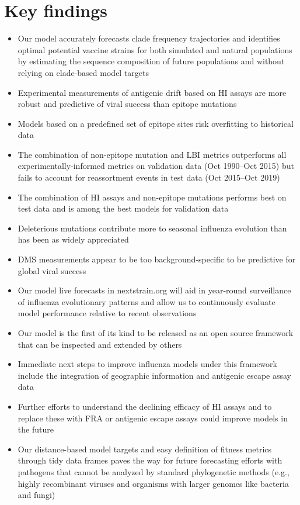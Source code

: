 \section*{Key findings}

\begin{itemize}
\item{Our model accurately forecasts clade frequency trajectories and identifies optimal potential vaccine strains for both simulated and natural populations by estimating the sequence composition of future populations and without relying on clade-based model targets}
\item{Experimental measurements of antigenic drift based on HI assays are more robust and predictive of viral success than epitope mutations}
\item{Models based on a predefined set of epitope sites risk overfitting to historical data}
\item{The combination of non-epitope mutation and LBI metrics outperforms all experimentally-informed metrics on validation data (Oct 1990--Oct 2015) but fails to account for reassortment events in test data (Oct 2015--Oct 2019)}
\item{The combination of HI assays and non-epitope mutations performs best on test data and is among the best models for validation data}
\item{Deleterious mutations contribute more to seasonal influenza evolution than has been as widely appreciated}
\item{DMS measurements appear to be too background-specific to be predictive for global viral success}
\item{Our model live forecasts in nextstrain.org will aid in year-round surveillance of influenza evolutionary patterns and allow us to continuously evaluate model performance relative to recent observations}
\item{Our model is the first of its kind to be released as an open source framework that can be inspected and extended by others}
\item{Immediate next steps to improve influenza models under this framework include the integration of geographic information and antigenic escape assay data}
\item{Further efforts to understand the declining efficacy of HI assays and to replace these with FRA or antigenic escape assays could improve models in the future}
\item{Our distance-based model targets and easy definition of fitness metrics through tidy data frames paves the way for future forecasting efforts with pathogens that cannot be analyzed by standard phylogenetic methods (e.g., highly recombinant viruses and organisms with larger genomes like bacteria and fungi)}
\end{itemize}

